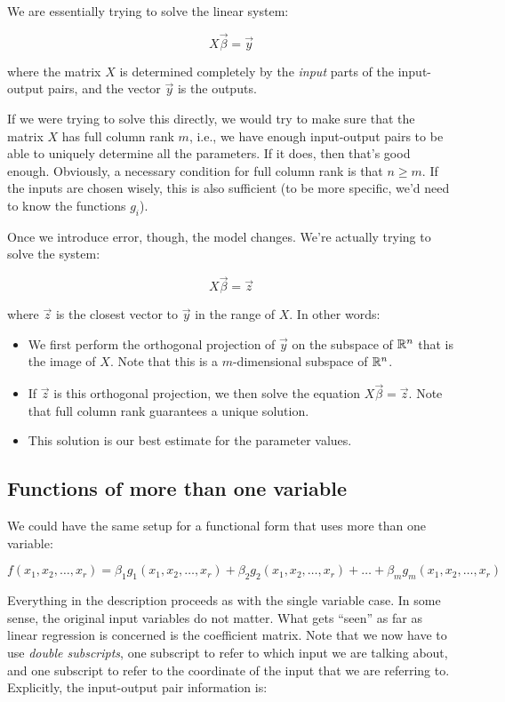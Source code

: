 \documentclass[10pt]{amsart}
\begin{document}
We are essentially trying to solve the linear system:

$$X\vec{\beta} = \vec{y}$$

where the matrix $X$ is determined completely by the {\em input} parts
of the input-output pairs, and the vector $\vec{y}$ is the outputs.

If we were trying to solve this directly, we would try to make sure
that the matrix $X$ has full column rank $m$, i.e., we have enough
input-output pairs to be able to uniquely determine all the
parameters. If it does, then that's good enough. Obviously, a
necessary condition for full column rank is that $n \ge m$. If the
inputs are chosen wisely, this is also sufficient (to be more
specific, we'd need to know the functions $g_i$).

Once we introduce error, though, the model changes. We're actually trying to solve the system:

$$X\vec{\beta} = \vec{z}$$

where $\vec{z}$ is the closest vector to $\vec{y}$ in the range of
$X$. In other words:

\begin{itemize}
\item We first perform the orthogonal projection of $\vec{y}$ on the
  subspace of $\mathbb{R}^n$ that is the image of $X$. Note that this is a
  $m$-dimensional subspace of $\mathbb{R}^n$.
\item If $\vec{z}$ is this orthogonal projection, we then solve the
  equation $X\vec{\beta} = \vec{z}$. Note that full column rank guarantees
  a unique solution.
\item This solution is our best estimate for the parameter values.
\end{itemize}

\subsection{Functions of more than one variable}

We could have the same setup for a functional form that uses more than
one variable:

$$f(x_1,x_2,\dots,x_r) = \beta_1g_1(x_1,x_2,\dots,x_r) + \beta_2g_2(x_1,x_2,\dots,x_r) + \dots + \beta_mg_m(x_1,x_2,\dots,x_r)$$

Everything in the description proceeds as with the single variable
case. In some sense, the original input variables do not matter. What
gets ``seen'' as far as linear regression is concerned is the
coefficient matrix. Note that we now have to use {\em double
  subscripts}, one subscript to refer to which input we are talking
about, and one subscript to refer to the coordinate of the input that
we are referring to. Explicitly, the input-output pair information
is:
\end{document}
